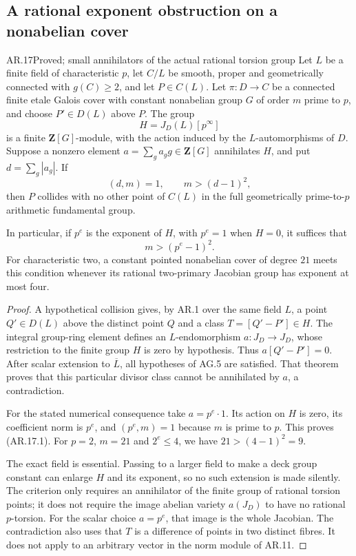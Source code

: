 \subsection{A rational exponent obstruction on a nonabelian cover}

\begin{claim}{AR.17}{Proved; small annihilators of the actual rational torsion group}
Let $L$ be a finite field of characteristic $p$, let $C/L$ be
smooth, proper and geometrically connected with $g(C)\ge2$, and
let $P\in C(L)$. Let $\pi:D\to C$ be a connected finite etale
Galois cover with constant nonabelian group $G$ of order $m$
prime to $p$, and choose $P'\in D(L)$ above $P$.
The group
\[
                 H=J_D(L)[p^\infty]
\]
is a finite $\mathbf Z[G]$-module, with the action induced by
the $L$-automorphisms of $D$. Suppose a nonzero element
$a=\sum_g a_g g\in\mathbf Z[G]$ annihilates $H$, and put
$d=\sum_g|a_g|$. If
\[
                    (d,m)=1,\qquad m>(d-1)^2,
\]
then $P$ collides with no other point of $C(L)$ in the full
geometrically prime-to-$p$ arithmetic fundamental group.

In particular, if $p^e$ is the exponent of $H$, with $p^e=1$
when $H=0$, it suffices that
\[
                         m>(p^e-1)^2.                 \tag{AR.17.1}
\]
For characteristic two, a constant pointed nonabelian cover
of degree $21$ meets this condition whenever its rational
two-primary Jacobian group has exponent at most four.
\end{claim}
\begin{proof}
A hypothetical collision gives, by AR.1 over the same field
$L$, a point $Q'\in D(L)$ above the distinct point $Q$ and
a class $T=[Q'-P']\in H$. The integral group-ring element
defines an $L$-endomorphism
$a:J_D\to J_D$, whose restriction to the finite group $H$
is zero by hypothesis. Thus $a[Q'-P']=0$. After scalar
extension to $\overline L$, all hypotheses of AG.5 are
satisfied. That theorem proves that this particular divisor
class cannot be annihilated by $a$, a contradiction.

For the stated numerical consequence take $a=p^e\cdot1$.
Its action on $H$ is zero, its coefficient norm is $p^e$,
and $(p^e,m)=1$ because $m$ is prime to $p$. This proves
(AR.17.1). For $p=2$, $m=21$ and $2^e\le4$, we have
$21>(4-1)^2=9$.

The exact field is essential. Passing to a larger field to
make a deck group constant can enlarge $H$ and its exponent,
so no such extension is made silently. The criterion only
requires an annihilator of the finite group of rational
torsion points; it does not require the image abelian variety
$a(J_D)$ to have no rational $p$-torsion. For the scalar
choice $a=p^e$, that image is the whole Jacobian. The
contradiction also uses that $T$ is a difference of points
in two distinct fibres. It does not apply to an arbitrary
vector in the norm module of AR.11.
\end{proof}


